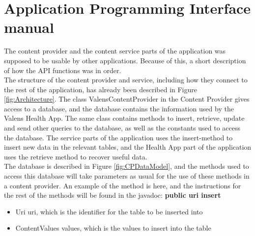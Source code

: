 \section{Application Programming Interface manual}
The content provider and the content service parts of the application was supposed to be usable by other applications. Because of this, a short description of how the API functions was in order. \\
The structure of the content provider and service, including how they connect to the rest of the application, has already been described in Figure \ref{fig:Architecture}. The class ValensContentProvider in the Content Provider gives access to a database, and the database contains the information used by the Valens Health App. The same class contains methods to insert, retrieve, update and send other queries to the database, as well as the constants used to access the database. The service parts of the application uses the insert-method to insert new data in the relevant tables, and the Health App part of the application uses the retrieve method to recover useful data. \\
The database is described in Figure \ref{fig:CPDataModel}, and the methods used to access this database will take parameters as usual for the use of these methods in a content provider. An example of the method is here, and the instructions for the rest of the methods will be found in the javadoc:
\textbf{public uri insert}
\begin{itemize}
\item Uri uri, which is the identifier for the table to be inserted into
\item ContentValues values, which is the values to insert into the table
\end{itemize}
